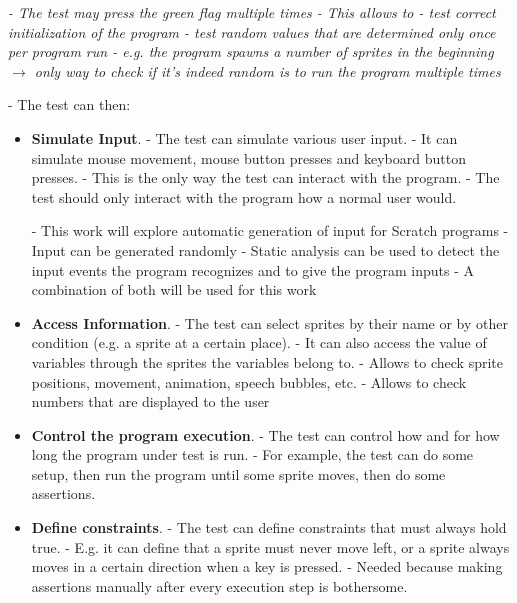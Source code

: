 \textit{- The test may press the green flag multiple times
- This allows to
    - test correct initialization of the program
    - test random values that are determined only once per program run
        - e.g. the program spawns a number of sprites in the beginning
        $\rightarrow$ only way to check if it's indeed random is to run the program multiple times
    }

\noindent- The test can then:
\begin{itemize}
    \item \textbf{Simulate Input}.
        - The test can simulate various user input.
        - It can simulate mouse movement, mouse button presses and keyboard button presses.
        - This is the only way the test can interact with the program.
        - The test should only interact with the program how a normal user would.

        - This work will explore automatic generation of input for Scratch programs
        - Input can be generated randomly
        - Static analysis can be used to detect the input events the program recognizes and to give the program inputs
        - A combination of both will be used for this work
    \item \textbf{Access Information}.
        - The test can select sprites by their name or by other condition (e.g. a sprite at a certain place).
        - It can also access the value of variables through the sprites the variables belong to.
        - Allows to check sprite positions, movement, animation, speech bubbles, etc.
        - Allows to check numbers that are displayed to the user
    \item \textbf{Control the program execution}.
        - The test can control how and for how long the program under test is run.
        - For example, the test can do some setup, then run the program until some sprite moves, then do some assertions.
    \item \textbf{Define constraints}.
        - The test can define constraints that must always hold true.
        - E.g. it can define that a sprite must never move left, or a sprite always moves in a certain direction when a key is pressed.
        - Needed because making assertions manually after every execution step is bothersome.
\end{itemize}

